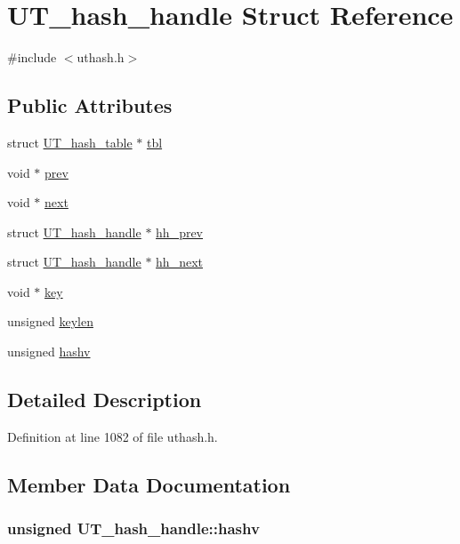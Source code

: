 \hypertarget{struct_u_t__hash__handle}{\section{U\-T\-\_\-hash\-\_\-handle Struct Reference}
\label{struct_u_t__hash__handle}
}


{\ttfamily \#include $<$uthash.\-h$>$}

\subsection*{Public Attributes}
\begin{DoxyCompactItemize}
\item 
struct \hyperlink{struct_u_t__hash__table}{U\-T\-\_\-hash\-\_\-table} $\ast$ \hyperlink{struct_u_t__hash__handle_ad90bfc052210ed0dfe1afcf51f3a89b5}{tbl}
\item 
void $\ast$ \hyperlink{struct_u_t__hash__handle_af266811bcd29460133f308987124034e}{prev}
\item 
void $\ast$ \hyperlink{struct_u_t__hash__handle_ac20c29619fd7716f7ba517a2cd651d27}{next}
\item 
struct \hyperlink{struct_u_t__hash__handle}{U\-T\-\_\-hash\-\_\-handle} $\ast$ \hyperlink{struct_u_t__hash__handle_a7426418517c3a1e93fe477e643f60e70}{hh\-\_\-prev}
\item 
struct \hyperlink{struct_u_t__hash__handle}{U\-T\-\_\-hash\-\_\-handle} $\ast$ \hyperlink{struct_u_t__hash__handle_a68446f17ac973f8e7e483ec3eca4891c}{hh\-\_\-next}
\item 
void $\ast$ \hyperlink{struct_u_t__hash__handle_a426a06699977756c3b26667ede8f7a2a}{key}
\item 
unsigned \hyperlink{struct_u_t__hash__handle_af2abdc405972a6bbdee2ade2c0f346c4}{keylen}
\item 
unsigned \hyperlink{struct_u_t__hash__handle_aae5e635fa110556e5007f627089f8323}{hashv}
\end{DoxyCompactItemize}


\subsection{Detailed Description}


Definition at line 1082 of file uthash.\-h.



\subsection{Member Data Documentation}
\hypertarget{struct_u_t__hash__handle_aae5e635fa110556e5007f627089f8323}{
\subsubsection[{hashv}]{\setlength{\rightskip}{0pt plus 5cm}unsigned U\-T\-\_\-hash\-\_\-handle\-::hashv}}\label{struct_u_t__hash__handle_aae5e635fa110556e5007f627089f8323}


